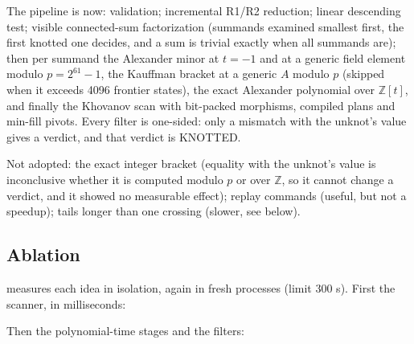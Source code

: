 The pipeline is now: validation; incremental R1/R2 reduction; linear descending
test; visible connected-sum factorization (summands examined smallest first,
the first knotted one decides, and a sum is trivial exactly when all summands
are); then per summand the Alexander minor at $t=-1$ and at a generic field
element modulo $p=2^{61}-1$, the Kauffman bracket at a generic $A$ modulo $p$
(skipped when it exceeds 4096 frontier states), the exact Alexander polynomial
over $\mathbb Z[t]$, and finally the Khovanov scan with bit-packed morphisms,
compiled plans and min-fill pivots. Every filter is one-sided: only a mismatch
with the unknot's value gives a verdict, and that verdict is KNOTTED.

Not adopted: the exact integer bracket (equality with the unknot's value is
inconclusive whether it is computed modulo $p$ or over $\mathbb Z$, so it
cannot change a verdict, and it showed no measurable effect); replay commands
(useful, but not a speedup); tails longer than one crossing (slower, see below).

\subsection{Ablation}
 measures each idea in isolation, again in fresh
processes (limit 300 s). First the scanner, in milliseconds:

\begin{center}\small
{}
\end{center}

Then the polynomial-time stages and the filters:

\begin{center}\small
{}
\end{center}

